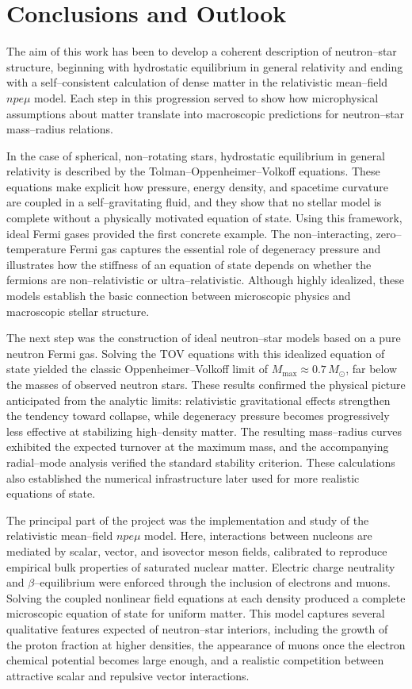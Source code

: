 \chapter{Conclusions and Outlook}
\label{chap:conclusion}

The aim of this work has been to develop a coherent description of
neutron--star structure, beginning with hydrostatic equilibrium in general
relativity and ending with a self--consistent calculation of dense matter in
the relativistic mean--field \(npe\mu\) model. Each step in this progression
served to show how microphysical assumptions about matter translate into
macroscopic predictions for neutron--star mass--radius relations.

In the case of spherical, non--rotating stars, hydrostatic equilibrium in
general relativity is described by the Tolman--Oppenheimer--Volkoff equations.
These equations make explicit how pressure, energy density, and spacetime
curvature are coupled in a self--gravitating fluid, and they show that no
stellar model is complete without a physically motivated equation of state.
Using this framework, ideal Fermi gases provided the first concrete example.
The non–interacting, zero–temperature Fermi gas captures the essential role of
degeneracy pressure and illustrates how the stiffness of an equation of state
depends on whether the fermions are non–relativistic or ultra–relativistic.
Although highly idealized, these models establish the basic connection between
microscopic physics and macroscopic stellar structure.

The next step was the construction of ideal neutron--star models based on a
pure neutron Fermi gas. Solving the TOV equations with this idealized equation
of state yielded the classic Oppenheimer--Volkoff limit of
$M_{\mathrm{max}}\!\approx\!0.7\,M_{\odot}$, far below the masses of observed
neutron stars. These results confirmed the physical picture anticipated from
the analytic limits: relativistic gravitational effects strengthen the tendency
toward collapse, while degeneracy pressure becomes progressively less effective
at stabilizing high–density matter. The resulting mass–radius curves exhibited
the expected turnover at the maximum mass, and the accompanying radial–mode
analysis verified the standard stability criterion. These calculations also
established the numerical infrastructure later used for more realistic
equations of state.

The principal part of the project was the implementation and study of the
relativistic mean–field $npe\mu$ model. Here, interactions between nucleons are
mediated by scalar, vector, and isovector meson fields, calibrated to reproduce
empirical bulk properties of saturated nuclear matter. Electric charge neutrality and
$\beta$–equilibrium were enforced through the inclusion of electrons and
muons. Solving the coupled nonlinear field equations at each density produced a
complete microscopic equation of state for uniform matter. This model captures
several qualitative features expected of neutron–star interiors, including the
growth of the proton fraction at higher densities, the appearance of muons once
the electron chemical potential becomes large enough, and a realistic
competition between attractive scalar and repulsive vector interactions.

